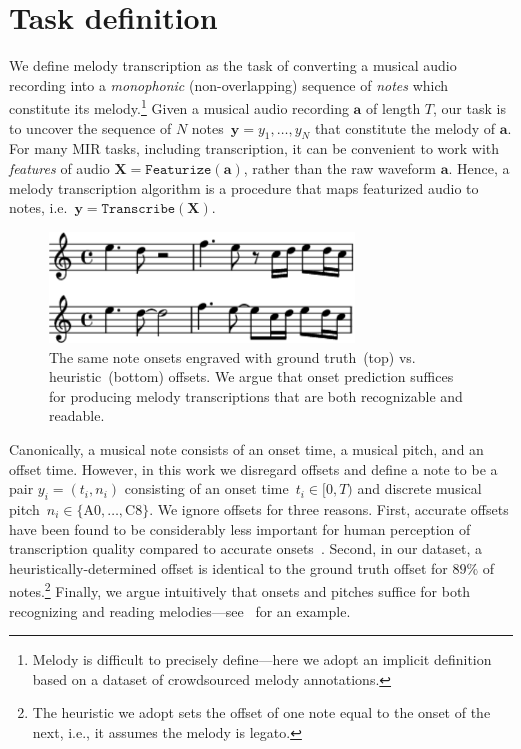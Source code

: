 \section{Task definition}
\label{sec:task}

We define melody transcription as the task of converting a musical audio recording into a \emph{monophonic} (non-overlapping) sequence of \emph{notes} which constitute its melody.\footnote{Melody is difficult to precisely define---here we adopt an implicit definition based on a dataset of crowdsourced melody annotations.} Given a musical audio recording $\bm{a}$ of length $T$, our task is to 
uncover 
the sequence of $N$ notes~${\bm{y} = y_1,\dots,y_N}$ that constitute the melody of $\bm{a}$.  For many MIR tasks, including transcription, it can be convenient to work with \emph{features} of audio ${\bm{X} = \texttt{Featurize}(\bm{a})}$, rather than the raw waveform $\bm{a}$. 
Hence, a melody transcription algorithm is a procedure that maps featurized audio to notes, i.e.~${\bm{y} = \texttt{Transcribe}(\bm{X})}$. 

\begin{figure}
    \centering
    \includegraphics[width=8.1cm]{figs/heuristic_offsets.pdf}
    \caption{
The same note onsets engraved with ground truth~(top) vs. heuristic~(bottom) offsets. 
We argue that onset prediction suffices for producing melody transcriptions that are both recognizable and readable. 
}
 \label{fig:heuristic_offsets}
\end{figure}

Canonically, a musical note consists of an onset time, a musical pitch, and an offset time. 
However, in this work  
we disregard offsets and define a note to be a pair ${y_i = (t_i,n_i)}$ consisting of an onset time~${t_i \in [0,T)}$ and discrete musical pitch~${n_i \in \{\text{A0},\dots,\text{C8}\}}$.
We ignore offsets for three reasons. 
First, accurate offsets have been found to be considerably less important for human perception of transcription quality compared to accurate onsets~\cite{ycart2020investigating}. 
Second, in our dataset,
a heuristically-determined offset is identical to the ground truth offset for $89\%$ of notes.\footnote{The heuristic we adopt sets the offset of one note equal to the onset of the next, i.e., it assumes the melody is legato.}
Finally, we argue intuitively that onsets and pitches suffice for both recognizing and reading melodies---see~ for an example.

